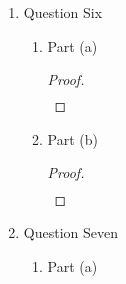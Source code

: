 \documentclass{article}
\begin{document}
\begin{enumerate}
\begin{enumerate}
\begin{proof}
\begin{align}
                &
            \end{align}
        \end{proof}
    \end{enumerate}
    \item Question Six
    \begin{enumerate}
        \item Part (a)
        \begin{proof}
            \begin{align}
                &
            \end{align}
        \end{proof}
        \item Part (b)
        \begin{proof}
            \begin{align}
                &
            \end{align}
        \end{proof}
    \end{enumerate}
    \item Question Seven
    \begin{enumerate}
        \item Part (a)
    \end{enumerate}
\end{enumerate}
\end{document}
